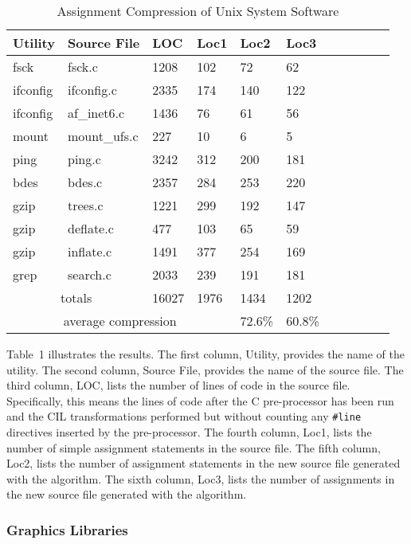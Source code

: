 \begin{table}
\begin{center}
\begin{tabular}{|l|l|l|l|l|l|l|l|l|l|l|} \hline
Utility & Source File & LOC & Loc1 & Loc2 & Loc3 \\ \hline
fsck & fsck.c & 1208 & 102 & 72 & 62 \\ \hline
ifconfig & ifconfig.c & 2335 & 174 & 140 & 122 \\ \hline
ifconfig & af\_inet6.c & 1436 & 76 & 61 & 56 \\ \hline
mount & mount\_ufs.c & 227 & 10 & 6 & 5 \\ \hline
ping & ping.c & 3242 & 312 & 200 & 181 \\ \hline
bdes & bdes.c & 2357 & 284 & 253 & 220 \\ \hline
gzip & trees.c & 1221 & 299 & 192 & 147 \\ \hline
gzip & deflate.c & 477 & 103 & 65 & 59 \\ \hline
gzip & inflate.c & 1491 & 377 & 254 & 169 \\ \hline
grep & search.c & 2033 & 239 & 191 & 181 \\ \hline
\multicolumn{2}{|c|}{totals} & 16027 & 1976 & 1434 & 1202 \\ \hline
\multicolumn{4}{|c|}{average compression} & 72.6\% & 60.8\% \\ \hline
\end{tabular}
\label{tableunix}
\end{center}
\caption{Assignment Compression of Unix System Software}
\end{table}

Table~1 illustrates the results.  The first column, Utility, provides the name
of the utility.  The second column, Source File, provides the name of the source
file.  The third column, LOC, lists the number of lines of code in the
source file.  Specifically, this means the lines of code after the C
pre-processor has been run and the CIL transformations performed but
without counting any \texttt{\#line} directives inserted by the
pre-processor.  The fourth column, Loc1, lists the number of simple
assignment statements in the source file.  The fifth column, Loc2, lists the
number of assignment statements in the new source file generated with
the \atomizer{} algorithm.  The sixth column, Loc3, lists the number of
assignments in the new source file generated with the \catomizer{}
algorithm.

\subsubsection{Graphics Libraries}

